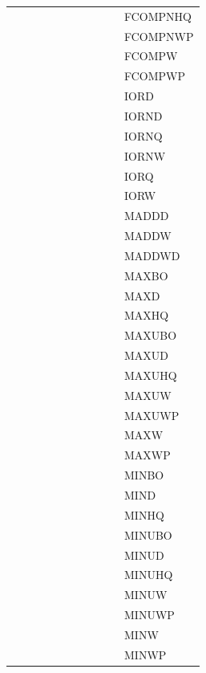 {\begin{tabular}{|l|l|l|l|l|l|l|l|l|l|l|}
 & & & & & & & & & & \textsf{FCOMPNHQ} \\
 & & & & & & & & & & \textsf{FCOMPNWP} \\
 & & & & & & & & & & \textsf{FCOMPW} \\
 & & & & & & & & & & \textsf{FCOMPWP} \\
 & & & & & & & & & & \textsf{IORD} \\
 & & & & & & & & & & \textsf{IORND} \\
 & & & & & & & & & & \textsf{IORNQ} \\
 & & & & & & & & & & \textsf{IORNW} \\
 & & & & & & & & & & \textsf{IORQ} \\
 & & & & & & & & & & \textsf{IORW} \\
 & & & & & & & & & & \textsf{MADDD} \\
 & & & & & & & & & & \textsf{MADDW} \\
 & & & & & & & & & & \textsf{MADDWD} \\
 & & & & & & & & & & \textsf{MAXBO} \\
 & & & & & & & & & & \textsf{MAXD} \\
 & & & & & & & & & & \textsf{MAXHQ} \\
 & & & & & & & & & & \textsf{MAXUBO} \\
 & & & & & & & & & & \textsf{MAXUD} \\
 & & & & & & & & & & \textsf{MAXUHQ} \\
 & & & & & & & & & & \textsf{MAXUW} \\
 & & & & & & & & & & \textsf{MAXUWP} \\
 & & & & & & & & & & \textsf{MAXW} \\
 & & & & & & & & & & \textsf{MAXWP} \\
 & & & & & & & & & & \textsf{MINBO} \\
 & & & & & & & & & & \textsf{MIND} \\
 & & & & & & & & & & \textsf{MINHQ} \\
 & & & & & & & & & & \textsf{MINUBO} \\
 & & & & & & & & & & \textsf{MINUD} \\
 & & & & & & & & & & \textsf{MINUHQ} \\
 & & & & & & & & & & \textsf{MINUW} \\
 & & & & & & & & & & \textsf{MINUWP} \\
 & & & & & & & & & & \textsf{MINW} \\
 & & & & & & & & & & \textsf{MINWP} \\

\end{tabular}}
